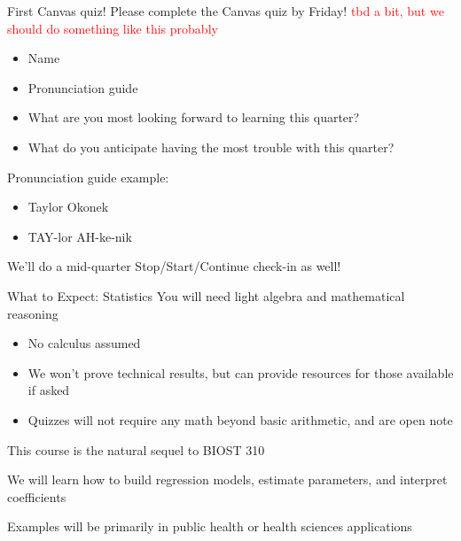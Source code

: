 \documentclass[10pt,t]{beamer}
\begin{document}
\begin{frame}{First Canvas quiz!}
Please complete the Canvas quiz by Friday! \textcolor{red}{tbd a bit, but we should do something like this probably} 

\vspace{0.3cm}

\begin{itemize}
	\item Name
	\item Pronunciation guide
	\item What are you most looking forward to learning this quarter?
	\item What do you anticipate having the most trouble with this quarter?
\end{itemize}

\vspace{0.3cm}

Pronunciation guide example:
\begin{itemize}
	\item Taylor Okonek
	\item TAY-lor AH-ke-nik
\end{itemize}

\vspace{0.3cm}

\color{blue} We'll do a mid-quarter Stop/Start/Continue check-in as well!

\end{frame}

\begin{frame}{What to Expect: Statistics}
You will need light algebra and mathematical reasoning
\vspace{0.3cm}
\begin{itemize}
	\item No calculus assumed
	\item We won't prove technical results, but can provide resources for those available if asked
	\item Quizzes will not require any math beyond basic arithmetic, and are open note
\end{itemize}

\vspace{0.3cm}

This course is the natural sequel to BIOST 310 

\vspace{0.3cm}

We will learn how to build regression models, estimate parameters, and interpret coefficients 

\vspace{0.3cm}

Examples will be primarily in public health or health sciences applications

\end{frame}
\end{document}
